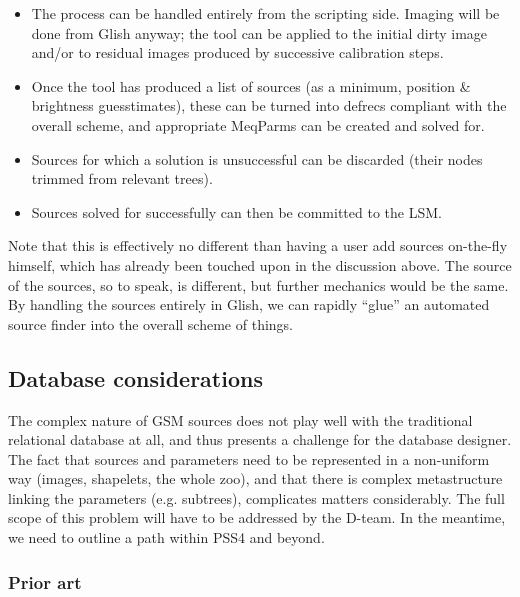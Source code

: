 \documentclass[10pt]{article}
\begin{document}
\begin{itemize} 

\item The process can be handled entirely from the scripting side. Imaging 
will be done from Glish anyway; the tool can be applied to the initial dirty
image and/or to residual images produced by successive calibration steps.

\item Once the tool has produced a list of sources (as a minimum, position \&
brightness guesstimates), these can be turned into defrecs compliant with the
overall scheme, and appropriate MeqParms can be created and solved for.

\item Sources for which a solution is unsuccessful can be discarded (their
nodes trimmed from relevant trees). 

\item Sources solved for successfully can then be committed to the LSM. 
\end{itemize}

Note that this is effectively no different than having a user add sources
on-the-fly himself, which has already been touched upon in the discussion
above. The source of the sources, so to speak, is different, but further
mechanics would be the same. By handling the sources entirely in Glish, we can
rapidly  ``glue'' an automated source finder into the overall scheme of things.

\subsection{Database considerations}

The complex nature of GSM sources does not play well with the traditional
relational database at all, and thus presents a challenge for the database
designer. The fact that sources and parameters need to be represented in a
non-uniform way (images, shapelets, the whole zoo), and that there is complex
metastructure linking the parameters (e.g. subtrees), complicates matters
considerably. The full scope of this problem will have to be addressed by the
D-team. In the meantime, we need to outline a path within PSS4 and beyond.

\subsubsection{Prior art}
\end{document}
